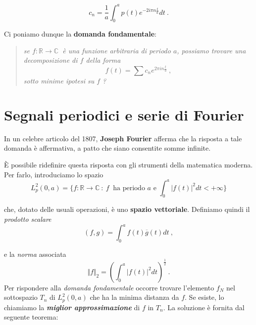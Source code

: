 \documentclass[
]{book}
\begin{document}
\begin{equation}
  c_n=\frac{1}{a} \int_{0}^{a}p(t)e^{-2 i \pi n \textstyle \frac {t}{a}}dt \ .
  \label{eq:formulafourier}
\end{equation}

Ci poniamo dunque la \textbf{domanda fondamentale}:

\begin{quote}
\emph{se \(f: \mathbb{R} \longrightarrow \mathbb{C} \ \) è una funzione arbitraria di periodo \(a\), possiamo trovare una decomposizione di \(f\) della forma}
\begin{equation}
f(t) = \sum c_n e^{2 \pi in\textstyle \frac{t}{a}} \ ,
\label{eq:domanda}
\end{equation}
\emph{sotto minime ipotesi su \(f\) ?}
\end{quote}

\hypertarget{seriefourier}{%
\section{Segnali periodici e serie di Fourier}\label{seriefourier}}

In un celebre articolo del 1807, \textbf{Joseph Fourier} afferma che la risposta a tale domanda è affermativa, a patto che siano consentite somme infinite.

È possibile ridefinire questa risposta con gli strumenti della matematica moderna.
Per farlo, introduciamo lo spazio
\[L_{p}^2(0,a)= \{ f:\mathbb{R} \longrightarrow \mathbb{C} \ : \ f \ \text{ ha periodo } a \text{ e } \int_{0}^{a}|f(t)|^2dt < +\infty\bigg\}\]

che, dotato delle usuali operazioni, è uno \textbf{spazio vettoriale}. Definiamo quindi il \emph{prodotto scalare}
\[(f,g) = \int_{0}^{a} f(t) \overline{g}(t)dt \ ,\]

e la \emph{norma} associata
\[ \Vert f \Vert_2 = \left( \int_{0}^{a} |f(t)|^2 dt \right) ^{\textstyle \frac{1}{2}} \ .\]
Per rispondere alla \emph{domanda fondamentale} occorre trovare l'elemento \(f_N\) nel sottospazio \(T_n\) di \(L_{p}^{2}(0,a)\) che ha la minima distanza da \(f\). Se esiste, lo chiamiamo la \emph{\textbf{miglior approssimazione}} di \(f\) in \(T_{n}\).
La soluzione è fornita dal seguente teorema:
\end{document}
